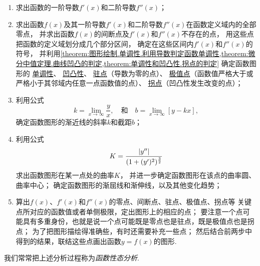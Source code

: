 \begin{enumerate}
	\item 求出函数的一阶导数\(f'(x)\)和二阶导数\(f''(x)\)；

	\item 求出函数\(f(x)\)及其一阶导数\(f'(x)\)和二阶导数\(f''(x)\)在函数定义域内的全部零点，
	并求出函数\(f(x)\)的间断点及\(f'(x)\)和\(f''(x)\)不存在的点，
	用这些点把函数的定义域划分成几个部分区间，
	确定在这些区间内\(f'(x)\)和\(f''(x)\)的符号，
	并利用\cref{theorem:图形绘制.单调性.利用导数判定函数单调性,theorem:微分中值定理.曲线凹凸的判定,theorem:单调性和凹凸性.拐点的判定}
	确定函数图形的%
	\hyperref[definition:函数的性质.单调性]{单调性}、%
	\hyperref[definition:函数图像的绘制.凹凸性的定义]{凹凸性}、%
	\hyperref[definition:函数的极值与最值.驻点]{驻点}（导数为零的点）、%
	\hyperref[definition:函数的极值与最值.极值点]{极值点}（函数值严格大于或严格小于其邻域内任意一点函数值的点）、%
	\hyperref[definition:单调性和凹凸性.拐点]{拐点}（凹凸性发生改变的点）；

	\item 利用公式\[
		k = \lim_{x\to\infty} \frac{y}{x},
		\quad\text{和}\quad
		b = \lim_{x\to\infty} \left[y - kx\right],
	\]确定函数图形的渐近线的斜率\(k\)和截距\(b\)；

	\item 利用公式\[
		K = \frac{\abs{y''}}{(1+(y')^2)^{\frac32}}
	\]求出函数图形在某一点处的曲率\(K\)，
	并进一步确定函数图形在该点的曲率圆、曲率中心；
	确定函数图形的渐屈线和渐伸线，以及其他变化趋势；

	\item 算出\(f(x)\)、\(f'(x)\)和\(f''(x)\)的零点、间断点、驻点、极值点、拐点等
	关键点所对应的函数值或者单侧极限，定出图形上的相应的点；
	要注意一个点可能具有多重身份，也就是说一个点可能既是零点也是驻点，既是极值点也是拐点；
	为了把图形描绘得准确些，有时还需要补充一些点；
	然后结合前两步中得到的结果，联结这些点画出函数\(y=f(x)\)的图形.
\end{enumerate}
我们常常把上述分析过程称为\emph{函数性态分析}.
